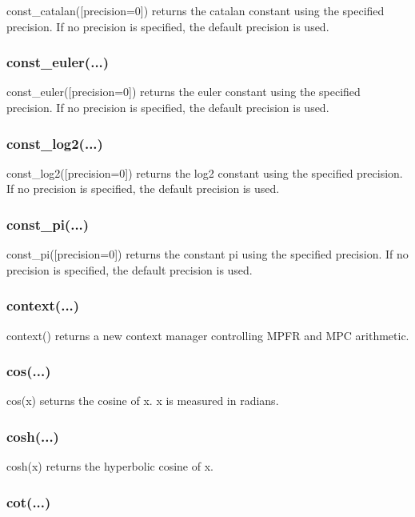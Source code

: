 const\_catalan([precision=0]) returns the catalan constant using the specified precision. If no
precision is specified, the default precision is used.

\subsubsection{const\_euler(...)}

const\_euler([precision=0]) returns the euler constant using the specified precision. If no
precision is specified, the default precision is used.

\subsubsection{const\_log2(...)}

const\_log2([precision=0]) returns the log2 constant using the specified precision. If no
precision is specified, the default precision is used.

\subsubsection{const\_pi(...)}

const\_pi([precision=0]) returns the constant pi using the specified precision. If no precision is
specified, the default precision is used.

\subsubsection{context(...)}

context() returns a new context manager controlling MPFR and MPC arithmetic.

\subsubsection{cos(...)}

cos(x) seturns the cosine of x. x is measured in radians.

\subsubsection{cosh(...)}

cosh(x) returns the hyperbolic cosine of x.

\subsubsection{cot(...)}

